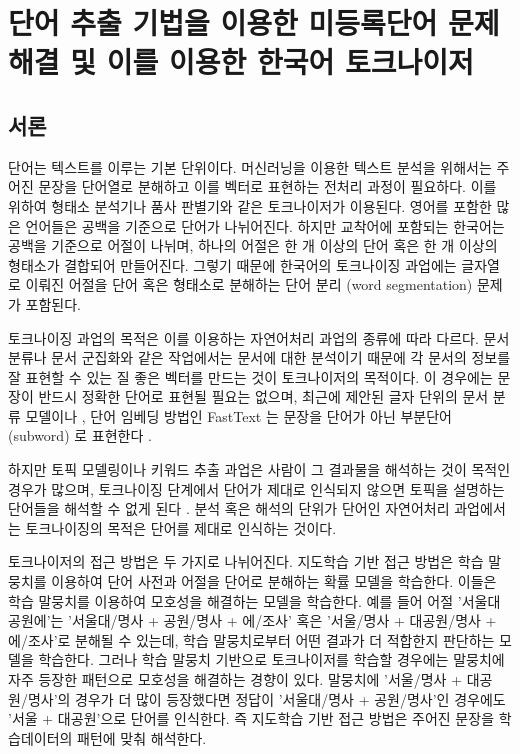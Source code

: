 \documentclass[11pt]{article}
\begin{document}
\newpage
\section{단어 추출 기법을 이용한 미등록단어 문제 해결 및 이를 이용한 한국어 토크나이저} \label{word_extraction}

\subsection{서론}
단어는 텍스트를 이루는 기본 단위이다.
머신러닝을 이용한 텍스트 분석을 위해서는 주어진 문장을 단어열로 분해하고 이를 벡터로 표현하는 전처리 과정이 필요하다.
이를 위하여 형태소 분석기나 품사 판별기와 같은 토크나이저가 이용된다.
영어를 포함한 많은 언어들은 공백을 기준으로 단어가 나뉘어진다.
하지만 교착어에 포함되는 한국어는 공백을 기준으로 어절이 나뉘며, 하나의 어절은 한 개 이상의 단어 혹은 한 개 이상의 형태소가 결합되어 만들어진다.
그렇기 때문에 한국어의 토크나이징 과업에는 글자열로 이뤄진 어절을 단어 혹은 형태소로 분해하는 단어 분리 (word segmentation) 문제가 포함된다.

토크나이징 과업의 목적은 이를 이용하는 자연어처리 과업의 종류에 따라 다르다.
문서 분류나 문서 군집화와 같은 작업에서는 문서에 대한 분석이기 때문에 각 문서의 정보를 잘 표현할 수 있는 질 좋은 벡터를 만드는 것이 토크나이저의 목적이다.
이 경우에는 문장이 반드시 정확한 단어로 표현될 필요는 없으며, 최근에 제안된 글자 단위의 문서 분류 모델이나 \citep{zhang2015character}, 단어 임베딩 방법인 FastText 는 문장을 단어가 아닌 부분단어 (subword) 로 표현한다 \citep{bojanowski2016enriching, joulin2016bag}.

하지만 토픽 모델링이나 키워드 추출 과업은 사람이 그 결과물을 해석하는 것이 목적인 경우가 많으며, 토크나이징 단계에서 단어가 제대로 인식되지 않으면 토픽을 설명하는 단어들을 해석할 수 없게 된다 \citep{hall2008studying}.
분석 혹은 해석의 단위가 단어인 자연어처리 과업에서는 토크나이징의 목적은 단어를 제대로 인식하는 것이다.

토크나이저의 접근 방법은 두 가지로 나뉘어진다.
지도학습 기반 접근 방법은 학습 말뭉치를 이용하여 단어 사전과 어절을 단어로 분해하는 확률 모델을 학습한다.
이들은 학습 말뭉치를 이용하여 모호성을 해결하는 모델을 학습한다.
예를 들어 어절 '서울대공원에'는 '서울대/명사 + 공원/명사 + 에/조사' 혹은 '서울/명사 + 대공원/명사 + 에/조사'로 분해될 수 있는데, 학습 말뭉치로부터 어떤 결과가 더 적합한지 판단하는 모델을 학습한다.
그러나 학습 말뭉치 기반으로 토크나이저를 학습할 경우에는 말뭉치에 자주 등장한 패턴으로 모호성을 해결하는 경향이 있다.
말뭉치에 '서울/명사 + 대공원/명사'의 경우가 더 많이 등장했다면 정답이 '서울대/명사 + 공원/명사'인 경우에도 '서울 + 대공원'으로 단어를 인식한다.
즉 지도학습 기반 접근 방법은 주어진 문장을 학습데이터의 패턴에 맞춰 해석한다.
\end{document}
